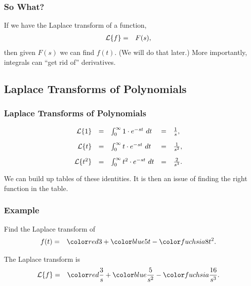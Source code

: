 \begin{frame}
  \frametitle{So What?}

  If we have the Laplace transform of a function, 
  \begin{eqnarray*}
    \laplace{f} & = & F(s),
  \end{eqnarray*}
  then given $F(s)$ we can find $f(t)$. (We will do that later.) More
  importantly, integrals can ``get rid of'' derivatives.

\end{frame}

\subsection{Laplace Transforms of Polynomials}

\begin{frame}
  \frametitle{Laplace Transforms of Polynomials}

  \begin{eqnarray*}
    \begin{array}{rcl@{\hspace{1em}}c@{\hspace{1em}}l}
    \laplace{1} & = & \int^\infty_0 1 \cdot e^{-st} ~ dt
    & = & \frac{1}{s}, \\ [10pt]
    \laplace{t} & = & \int^\infty_0 t \cdot e^{-st} ~ dt
    & = & \frac{1}{s^2}, \\ [10pt]
    \laplace{t^2} & = & \int^\infty_0 t^2 \cdot e^{-st} ~ dt
    & = & \frac{2}{s^3}.      
    \end{array}
  \end{eqnarray*}

  {%
    We can build up tables of these identities. It is then an issue of
    finding the right function in the table.
  }

\end{frame}


\begin{frame}
  \frametitle{Example}

  Find the Laplace transform of 
  \begin{eqnarray*}
    f(t) & = & \redText{3} + \blueText{5t} - \fuchsiaText{8t^2}.
  \end{eqnarray*}

  {
    
    The Laplace transform is
    \begin{eqnarray*}
      \laplace{f} & = & \redText{\frac{3}{s}} + \blueText{\frac{5}{s^2}} - \fuchsiaText{\frac{16}{s^3}}.
    \end{eqnarray*}

  }

\end{frame}


